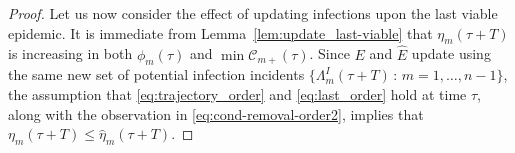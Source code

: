 \documentclass[]{article}
\newcommand{\Infections}{\mathcal{I}}
\newcommand{\Conditioned}{\mathcal{C}}
\newcommand{\Epidemic}{E}%
\begin{document}
\begin{proof}
	Let us now consider the effect of updating infections upon the last viable epidemic. It is immediate from Lemma~\ref{lem:update_last-viable} that \(\eta_m(\tau+T)\) is increasing in both \(\phi_m(\tau)\) and \(\min\Conditioned_{m+}(\tau)\). Since \(\Epidemic\) and \(\hat\Epidemic\) update using the same new set of potential infection incidents \(\{\Lambda^I_m(\tau+T)\,:\, m=1,\dots,n-1\}\), the assumption that \eqref{eq:trajectory_order} and \eqref{eq:last_order} hold at time \(\tau\), along with the observation in \eqref{eq:cond-removal-order2}, implies that \(\eta_m(\tau+T) \le \hat \eta_m(\tau+T) \).
%

\end{proof}
\end{document}
